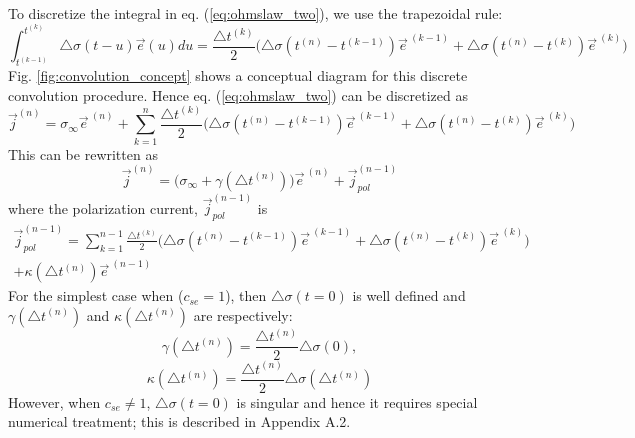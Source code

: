\documentclass[manuscript]{geophysics}
\newcommand{\siginf}{\sigma_\infty}
\newcommand{\dsig}{\triangle\sigma}
\renewcommand {\j}  { {\vec j} }
\newcommand {\e}  { {\vec e} }
\begin{document}
To discretize the integral in eq. (\ref{eq:ohmslaw_two}), we use the trapezoidal rule:
\begin{equation}
  \int_{t^{(k-1)}}^{t^{(k)}} \dsig(t-u) \e (u) du
  = \frac{\triangle t^{(k)}}{2} \Big(\dsig (t^{(n)} - t^{(k-1)}) \e^{\ (k-1)} + \dsig (t^{(n)} - t^{(k)}) \e^{\ (k)} \Big)
  \label{eq:convolution_trapezoidal}
\end{equation}
Fig. \ref{fig:convolution_concept} shows a conceptual diagram for this discrete convolution procedure.
Hence eq. (\ref{eq:ohmslaw_two}) can be discretized as
\begin{equation}
  \j^{(n)} = \siginf \e^{\ (n)} +
  \sum_{k=1}^{n} \frac{\triangle t^{(k)}}{2} \Big(\dsig (t^{(n)} - t^{(k-1)}) \e^{\ (k-1)} + \dsig (t^{(n)} - t^{(k)}) \e^{\ (k)} \Big)
  \label{eq:ohmslaw_time_original}
\end{equation}
This can be rewritten as
\begin{equation}
  \j^{(n)} = \Big(\siginf + \gamma (\triangle t^{(n)})\Big)\e^{\ (n)} + \j_{pol}^{(n-1)}
  \label{eq:ohmslaw_time}
\end{equation}
where the polarization current, $\j_{pol}^{(n-1)}$ is
\begin{align}
  \j_{pol}^{(n-1)} = \sum_{k=1}^{n-1} \frac{\triangle t^{(k)}}{2} \Big(\dsig (t^{(n)} - t^{(k-1)}) \e^{\ (k-1)} + \dsig (t^{(n)} - t^{(k)}) \e^{\ (k)} \Big) \nonumber \\
  +  \kappa(\triangle t^{(n)}) \e^{\ (n-1)}
\end{align}
For the simplest case when ($c_{se}=1$), then $\dsig(t=0)$  is well defined and  $\gamma (\triangle t^{(n)})$ and $\kappa (\triangle t^{(n)})$ are respectively:
\begin{equation}
  \gamma(\triangle t^{(n)}) = \frac{\triangle t^{(n)}}{2}\dsig (0),
\end{equation}
\begin{equation}
  \kappa(\triangle t^{(n)}) = \frac{\triangle t^{(n)}}{2} \dsig (\triangle t^{(n)})
\end{equation}
However, when $c_{se}\neq1$, $\dsig(t=0)$ is singular and hence it requires special numerical treatment; this is described in Appendix A.2.
\end{document}
